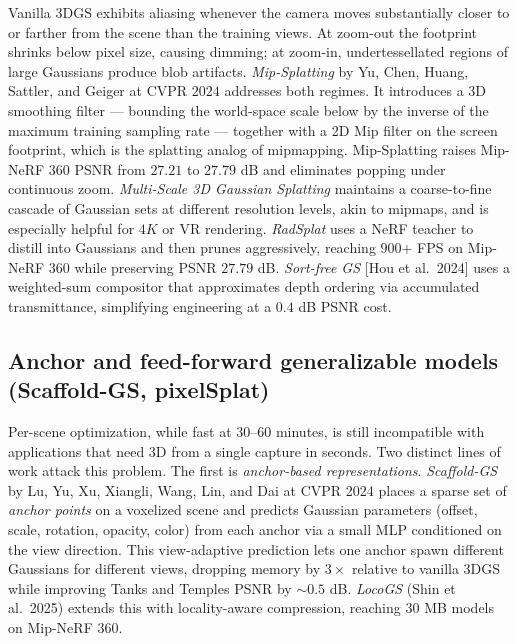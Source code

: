 \documentclass{article}
\begin{document}
Vanilla 3DGS exhibits aliasing whenever the camera moves substantially closer to or farther from the scene than the training views. At zoom-out the footprint shrinks below pixel size, causing dimming; at zoom-in, undertessellated regions of large Gaussians produce blob artifacts. \emph{Mip-Splatting} by Yu, Chen, Huang, Sattler, and Geiger at CVPR \(2024\) \cite{yu2024mipsplattingaliasf} addresses both regimes. It introduces a 3D smoothing filter --- bounding the world-space scale below by the inverse of the maximum training sampling rate --- together with a 2D Mip filter on the screen footprint, which is the splatting analog of mipmapping. Mip-Splatting raises Mip-NeRF 360 PSNR from \(27.21\) to \(27.79\) dB and eliminates popping under continuous zoom. \emph{Multi-Scale 3D Gaussian Splatting} \cite{yan2024multiscale3dgaussi} maintains a coarse-to-fine cascade of Gaussian sets at different resolution levels, akin to mipmaps, and is especially helpful for \(4K\) or VR rendering. \emph{RadSplat} \cite{niemeyer2025radsplatradiancefi} uses a NeRF teacher to distill into Gaussians and then prunes aggressively, reaching \(900\)+ FPS on Mip-NeRF 360 while preserving PSNR \(27.79\) dB. \emph{Sort-free GS} {[}Hou et al.~2024{]} uses a weighted-sum compositor that approximates depth ordering via accumulated transmittance, simplifying engineering at a \(0.4\) dB PSNR cost.

\subsection{Anchor and feed-forward generalizable models (Scaffold-GS, pixelSplat)}\label{anchor-and-feed-forward-generalizable-models-scaffold-gs-pixelsplat}

Per-scene optimization, while fast at \(30\)--\(60\) minutes, is still incompatible with applications that need 3D from a single capture in seconds. Two distinct lines of work attack this problem. The first is \emph{anchor-based representations}. \emph{Scaffold-GS} by Lu, Yu, Xu, Xiangli, Wang, Lin, and Dai at CVPR 2024 \cite{lu2024scaffoldgsstructur} places a sparse set of \emph{anchor points} on a voxelized scene and predicts Gaussian parameters (offset, scale, rotation, opacity, color) from each anchor via a small MLP conditioned on the view direction. This view-adaptive prediction lets one anchor spawn different Gaussians for different views, dropping memory by \(3\times\) relative to vanilla 3DGS while improving Tanks and Temples PSNR by \(\sim 0.5\) dB. \emph{LocoGS} (Shin et al.~2025) extends this with locality-aware compression, reaching \(30\) MB models on Mip-NeRF 360.
\end{document}

